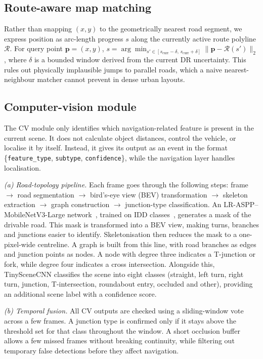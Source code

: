 \documentclass[conference]{IEEEtran}
\begin{document}
\subsection{Route-aware map matching}
Rather than snapping $(x,y)$ to the geometrically nearest road segment, we express position as arc-length progress $s$ along the currently active route polyline $\mathcal{R}$. For query point $\mathbf{p}=(x,y)$, $s = \arg\min_{s' \in [s_\text{curr}-\delta,\, s_\text{curr}+\delta]} \|\mathbf{p} - \mathcal{R}(s')\|_2$, where $\delta$ is a bounded window derived from the current DR uncertainty. This rules out physically implausible jumps to parallel roads, which a naive nearest-neighbour matcher cannot prevent in dense urban layouts.

\subsection{Computer-vision module}
The CV module only identifies which navigation-related feature is present in the current scene. It does not calculate object distances, control the vehicle, or localise it by itself. Instead, it gives its output as an event in the format \{\texttt{feature\_type}, \texttt{subtype}, \texttt{confidence}\}, while the navigation layer handles localisation.

\emph{(a) Road-topology pipeline.} Each frame goes through the following steps: frame $\rightarrow$ road segmentation $\rightarrow$ bird's-eye view (BEV) transformation $\rightarrow$ skeleton extraction $\rightarrow$ graph construction $\rightarrow$ junction-type classification. An LR-ASPP--MobileNetV3-Large network~\cite{howard2019searching}, trained on IDD classes~\cite{iddvarma2019}, generates a mask of the drivable road. This mask is transformed into a BEV view, making turns, branches and junctions easier to identify. Skeletonisation then reduces the mask to a one-pixel-wide centreline. A graph is built from this line, with road branches as edges and junction points as nodes. A node with degree three indicates a T-junction or fork, while degree four indicates a cross intersection. Alongside this, TinySceneCNN classifies the scene into eight classes (straight, left turn, right turn, junction, T-intersection, roundabout entry, occluded and other), providing an additional scene label with a confidence score.

\emph{(b) Temporal fusion.} All CV outputs are checked using a sliding-window vote across a few frames. A junction type is confirmed only if it stays above the threshold set for that class throughout the window. A short occlusion buffer allows a few missed frames without breaking continuity, while filtering out temporary false detections before they affect navigation.
\end{document}
